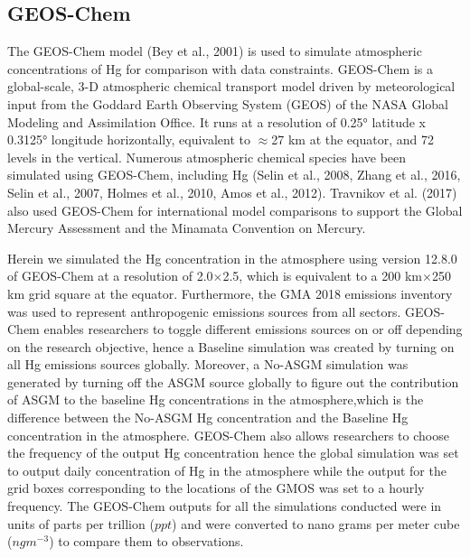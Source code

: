 \subsection{GEOS-Chem}
\begin{flushleft}
The GEOS-Chem model (Bey et al., 2001) is used to simulate atmospheric concentrations of Hg for comparison with data constraints. GEOS-Chem is a global-scale, 3-D atmospheric chemical transport model driven by meteorological input from the Goddard Earth Observing System (GEOS) of the NASA Global Modeling and Assimilation Office. It runs at a resolution of 0.25° latitude x 0.3125° longitude horizontally, equivalent to $\approx$27 km at the equator, and 72 levels in the vertical. Numerous atmospheric chemical species have been simulated using GEOS-Chem, including Hg (Selin et al., 2008, Zhang et al., 2016, Selin et al., 2007, Holmes et al., 2010, Amos et al., 2012). Travnikov et al. (2017) also used GEOS-Chem for international model comparisons to support the Global Mercury Assessment and the Minamata Convention on Mercury.
\end{flushleft}
\begin{flushleft}

Herein we simulated the Hg concentration in the atmosphere using version 12.8.0 of GEOS-Chem at a resolution of 2.0$\times$2.5, which is equivalent to a 200 km$\times$250 km grid square at the equator. Furthermore, the GMA 2018 emissions inventory was used to represent anthropogenic emissions sources from all sectors. GEOS-Chem enables researchers to toggle different emissions sources on or off depending on the research objective, hence a Baseline simulation was created by turning on all Hg emissions sources globally. Moreover, a No-ASGM simulation was generated by turning off the ASGM source globally to figure out the contribution of ASGM to the baseline Hg concentrations in the atmosphere,which is the difference between the No-ASGM Hg concentration and the Baseline Hg concentration in the atmosphere. GEOS-Chem also allows researchers to choose the frequency of the output Hg concentration hence the global simulation was set to output daily concentration of Hg in the atmosphere while the output for the grid boxes corresponding to the locations of the GMOS was set to a hourly frequency. The GEOS-Chem outputs for all the simulations conducted were in units of parts per trillion ($ppt$) and were converted to nano grams per meter cube ($ngm^{-3}$) to compare them to observations.
\end{flushleft}

